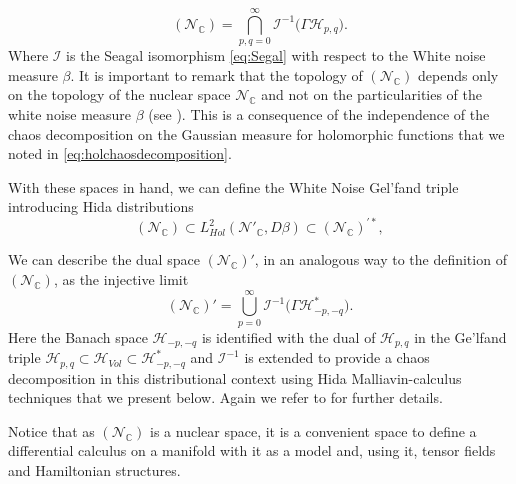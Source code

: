 \documentclass{elsarticle}%
\begin{document}
\begin{equation}
\label{eq:Hidatestfunction}
(\mathcal{N}_{\mathbb{C}})=\bigcap_{p,q=0}^\infty  \mathcal{I}^{-1}\Big(\Gamma \mathcal{H}_{p,q}\Big).
\end{equation}
Where $\mathcal{I}$ is the Seagal isomorphism \eqref{eq:Segal} with respect to the White noise measure $\beta$. It is important to remark that the topology of $(\mathcal{N}_{\mathbb{C}})$ depends only on the topology of the nuclear space $\mathcal{N}_{\mathbb{C}}$ and not on the particularities of the white noise measure $\beta$ (see \cite{kondratievGeneralizedFunctionals1996, westerkampRecentResults2003}). This is a consequence of the independence of the chaos decomposition  on the Gaussian measure  for holomorphic functions that we noted in \eqref{eq:holchaosdecomposition}.
 

With these spaces in hand, we can define the  White Noise  Gel'fand triple introducing Hida distributions 
\begin{equation}
\label{eq:Triple_hida}
(\mathcal{N}_{\mathbb{C}})\subset L^2_{Hol}(\mathcal{N}'_{\mathbb{C}}, D\beta)\subset (\mathcal{N}_{\mathbb{C}})^{\prime *},
\end{equation}


     We can describe the dual space $(\mathcal{N}_{\mathbb{C}})'$, in an analogous way to the definition of $(\mathcal{N}_{\mathbb{C}})$, as the injective limit
    \begin{equation}
      \label{eq:Hidatestfunctionduak}
      (\mathcal{N}_{\mathbb{C}})'=\bigcup_{p=0}^\infty \mathcal{I}^{-1}\Big(\Gamma \mathcal{H}_{-p,-q}^*\Big).
    \end{equation}   
   Here the Banach space  $\mathcal{H}_{-p,-q}$ is identified with the dual of $\mathcal{H}_{p,q}$ in the Ge'lfand triple $
    \mathcal{H}_{p,q} \subset \mathcal{H}_{Vol} \subset \mathcal{H}_{-p,-q}^*
    $ and $\mathcal{I}^{-1}$ is extended to provide a chaos decomposition in this distributional context using Hida Malliavin-calculus techniques that we present below. Again we refer to  \cite{ hidaWhiteNoise1993, kuoWhiteNoise1996, obataWhiteNoise1994, kondratievGeneralizedFunctionals1996} for further details.

  

  Notice that as $(\mathcal{N}_{\mathbb{C}})$ is a nuclear space, it is a convenient space to define a differential calculus on a manifold with it as a model and,  using it, tensor fields and Hamiltonian structures. 
\end{document}
